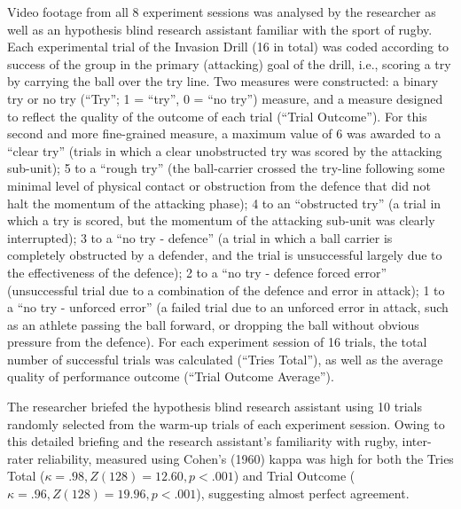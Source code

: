 \begin{CJK}{UTF8}{gbsn}
Video footage from all 8 experiment sessions was analysed by the researcher as well as an hypothesis blind research assistant familiar with the sport of rugby.  Each experimental trial of the Invasion Drill (16 in total) was coded according to success of the group in the primary (attacking) goal of the drill, i.e., scoring a try by carrying the ball over the try line.  Two measures were constructed: a binary try or no try (``Try''; 1 = ``try'', 0 = ``no try'') measure, and a measure designed to reflect the quality of the outcome of each trial (``Trial Outcome''). For this second and more fine-grained measure, a maximum value of 6 was awarded to a ``clear try'' (trials in which a clear unobstructed try was scored by the attacking sub-unit); 5 to a ``rough try'' (the ball-carrier crossed the try-line following some minimal level of physical contact or obstruction from the defence that did not halt the momentum of the attacking phase); 4 to an ``obstructed try'' (a trial in which a try is scored, but the momentum of the attacking sub-unit was clearly interrupted); 3 to a ``no try - defence'' (a trial in which a ball carrier is completely obstructed by a defender, and the trial is unsuccessful largely due to the effectiveness of the defence); 2 to a ``no try - defence forced error'' (unsuccessful trial due to a combination of the defence and error in attack); 1 to a ``no try - unforced error'' (a failed trial due to an unforced error in attack, such as an athlete passing the ball forward, or dropping the ball without obvious pressure from the defence).  For each experiment session of 16 trials, the total number of successful trials was calculated (``Tries Total''), as well as the average quality of performance outcome (``Trial Outcome Average'').


The researcher briefed the hypothesis blind research assistant using 10 trials randomly selected from the warm-up trials of each experiment session. Owing to this detailed briefing and the research assistant's familiarity with rugby, inter-rater reliability, measured using Cohen's (1960) kappa \citep[suitable for two coders, see][]{DiEugenio2004} was high for both the Tries Total ($\kappa = .98, Z(128) = 12.60, p < .001$) and Trial Outcome ($\kappa = .96, Z(128) = 19.96, p < .001$), suggesting almost perfect agreement.


\end{CJK}
